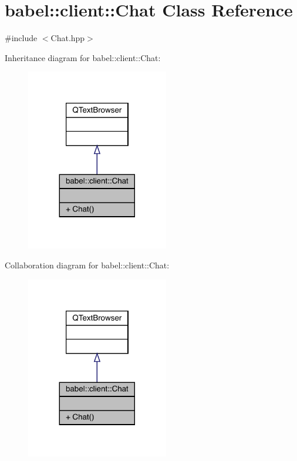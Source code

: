 \hypertarget{classbabel_1_1client_1_1_chat}{}\section{babel\+:\+:client\+:\+:Chat Class Reference}
\label{classbabel_1_1client_1_1_chat}


{\ttfamily \#include $<$Chat.\+hpp$>$}



Inheritance diagram for babel\+:\+:client\+:\+:Chat\+:\nopagebreak
\begin{figure}[H]
\begin{center}
\leavevmode
\includegraphics[width=176pt]{classbabel_1_1client_1_1_chat__inherit__graph}
\end{center}
\end{figure}


Collaboration diagram for babel\+:\+:client\+:\+:Chat\+:\nopagebreak
\begin{figure}[H]
\begin{center}
\leavevmode
\includegraphics[width=176pt]{classbabel_1_1client_1_1_chat__coll__graph}
\end{center}
\end{figure}
